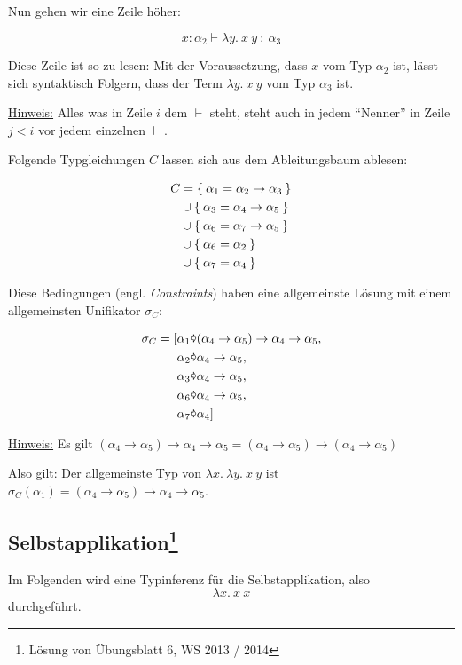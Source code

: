 Nun gehen wir eine Zeile höher:

\[x:\alpha_2 \vdash \lambda y.\ x\ y\ :\ \alpha_3\]

Diese Zeile ist so zu lesen: Mit der Voraussetzung, dass $x$ vom Typ $\alpha_2$
ist, lässt sich syntaktisch Folgern, dass der Term $\lambda y.\ x\ y$ vom
Typ $\alpha_3$ ist.

\underline{Hinweis:} Alles was in Zeile $i$ dem $\vdash$ steht, steht auch in 
jedem \enquote{Nenner} in Zeile $j < i$ vor jedem einzelnen $\vdash$.

Folgende Typgleichungen $C$ lassen sich aus dem Ableitungsbaum ablesen:

\begin{align*}
	C &= \Set{\alpha_1 = \alpha_2 \rightarrow \alpha_3}\\
	  &\cup \Set{\alpha_3 = \alpha_4 \rightarrow \alpha_5}\\
	  &\cup \Set{\alpha_6 = \alpha_7 \rightarrow \alpha_5}\\
	  &\cup \Set{\alpha_6 = \alpha_2}\\
	  &\cup \Set{\alpha_7 = \alpha_4}
\end{align*}

Diese Bedingungen (engl. \textit{Constraints}) haben eine
allgemeinste Lösung mit einem allgemeinsten Unifikator $\sigma_C$:

\begin{align*}
	\sigma_C = [&\alpha_1 \Parr (\alpha_4 \rightarrow \alpha_5) \rightarrow \alpha_4 \rightarrow \alpha_5,\\
	&\alpha_2 \Parr \alpha_4 \rightarrow \alpha_5,\\
	&\alpha_3 \Parr \alpha_4 \rightarrow \alpha_5,\\
	&\alpha_6 \Parr \alpha_4 \rightarrow \alpha_5,\\
	&\alpha_7 \Parr \alpha_4]
\end{align*}

\underline{Hinweis:} Es gilt $(\alpha_4 \rightarrow \alpha_5) \rightarrow \alpha_4 \rightarrow \alpha_5 = (\alpha_4 \rightarrow \alpha_5) \rightarrow (\alpha_4 \rightarrow \alpha_5)$

Also gilt: Der allgemeinste Typ von $\lambda x.\ \lambda y.\ x\ y$ ist $\sigma_C (\alpha_1) = (\alpha_4 \rightarrow \alpha_5) \rightarrow \alpha_4 \rightarrow \alpha_5$.

\subsection[Selbstapplikation]{Selbstapplikation\footnote{Lösung von Übungsblatt 6, WS 2013 / 2014}}
Im Folgenden wird eine Typinferenz für die Selbstapplikation, also
\[\lambda x.\ x\ x\]
durchgeführt.

